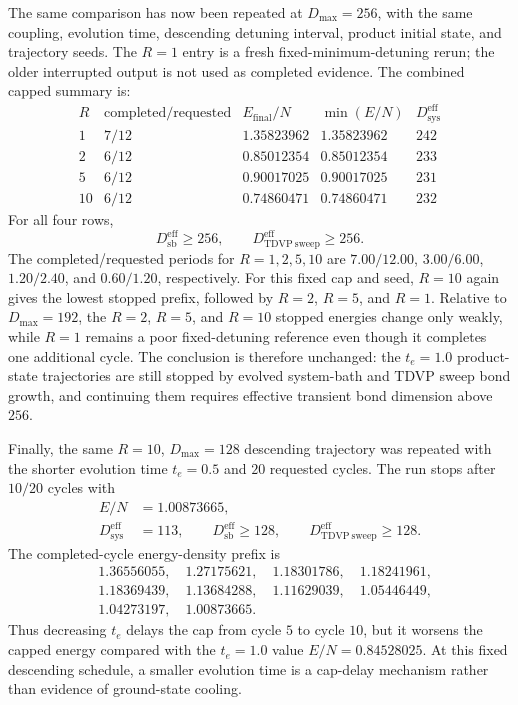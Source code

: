\documentclass[aps,pra,twocolumn,superscriptaddress,nolongbibliography,nobalancelastpage,10pt]{revtex4-2}
\begin{document}
The same comparison has now been repeated at \(D_{\max}=256\), with the same
coupling, evolution time, descending detuning interval, product initial state,
and trajectory seeds.  The \(R=1\) entry is a fresh fixed-minimum-detuning
rerun; the older interrupted output is not used as completed evidence.  The
combined capped summary is:
\[
\begin{array}{c|c|c|c|c}
R & \text{completed/requested} & E_{\mathrm{final}}/N
  & \min(E/N) & D_{\mathrm{sys}}^{\mathrm{eff}}\\
\hline
1 & 7/12 & 1.35823962 & 1.35823962 & 242\\
2 & 6/12 & 0.85012354 & 0.85012354 & 233\\
5 & 6/12 & 0.90017025 & 0.90017025 & 231\\
10 & 6/12 & 0.74860471 & 0.74860471 & 232
\end{array}
\]
For all four rows,
\[
	D_{\mathrm{sb}}^{\mathrm{eff}}\geq 256,\qquad
	D_{\mathrm{TDVP\ sweep}}^{\mathrm{eff}}\geq 256 .
\]
The completed/requested periods for \(R=1,2,5,10\) are
\(7.00/12.00\), \(3.00/6.00\), \(1.20/2.40\), and \(0.60/1.20\),
respectively.
For this fixed cap and seed, \(R=10\) again gives the lowest stopped prefix,
followed by \(R=2\), \(R=5\), and \(R=1\).  Relative to \(D_{\max}=192\), the
\(R=2\), \(R=5\), and \(R=10\) stopped energies change only weakly, while
\(R=1\) remains a poor fixed-detuning reference even though it completes one
additional cycle.  The conclusion is therefore unchanged: the \(t_e=1.0\)
product-state trajectories are still stopped by evolved system-bath and TDVP
sweep bond growth, and continuing them requires effective transient bond
dimension above \(256\).

Finally, the same \(R=10\), \(D_{\max}=128\) descending trajectory was repeated
with the shorter evolution time \(t_e=0.5\) and \(20\) requested cycles.  The
run stops after \(10/20\) cycles with
\[
\begin{aligned}
	E/N&=1.00873665,\\
	D_{\mathrm{sys}}^{\mathrm{eff}}&=113,\qquad
	D_{\mathrm{sb}}^{\mathrm{eff}}\geq 128,\qquad
	D_{\mathrm{TDVP\ sweep}}^{\mathrm{eff}}\geq 128 .
\end{aligned}
\]
The completed-cycle energy-density prefix is
\[
\begin{aligned}
	&1.36556055,\quad 1.27175621,\quad 1.18301786,\quad 1.18241961,\\
	&1.18369439,\quad 1.13684288,\quad 1.11629039,\quad 1.05446449,\\
	&1.04273197,\quad 1.00873665 .
\end{aligned}
\]
Thus decreasing \(t_e\) delays the cap from cycle \(5\) to cycle \(10\), but it
worsens the capped energy compared with the \(t_e=1.0\) value
\(E/N=0.84528025\).  At this fixed descending schedule, a smaller evolution
time is a cap-delay mechanism rather than evidence of ground-state cooling.
\end{document}
